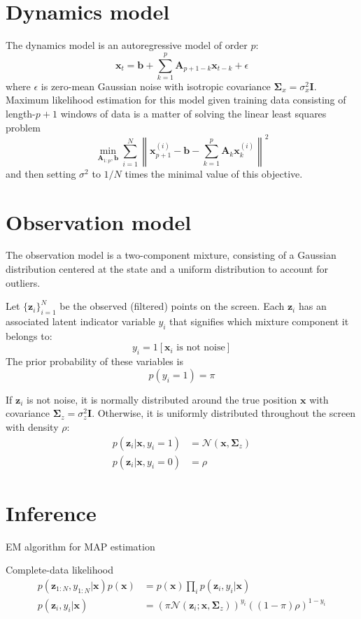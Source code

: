 \documentclass{article}
\newcommand{\bA}{\mathbf{A}}
\newcommand{\bI}{\mathbf{I}}
\newcommand{\bx}{\mathbf{x}}
\newcommand{\bz}{\mathbf{z}}
\newcommand{\bb}{\mathbf{b}}
\newcommand{\bSigma}{{\bm \Sigma}}
\newcommand{\cN}{\mathcal{N}}
\begin{document}
\section{Dynamics model}
The dynamics model is an autoregressive model of order $p$:
\[
\bx_t = \bb + \sum_{k=1}^p \bA_{p+1-k} \bx_{t-k} + \epsilon
\]
where $\epsilon$ is zero-mean Gaussian noise with isotropic covariance $\bSigma_x = \sigma_x^2\bI$.
Maximum likelihood estimation for this model given training data consisting of length-$p+1$ windows of data is a matter of solving the linear least squares problem
\[
\min_{\bA_{1:p}, \bb} \sum_{i=1}^N \left\| \bx_{p+1}^{(i)} - \bb - \sum_{k=1}^p\bA_k\bx_k^{(i)} \right\|^2
\]
and then setting $\sigma^2$ to $1/N$ times the minimal value of this objective.

\section{Observation model}
The observation model is a two-component mixture, consisting of a Gaussian distribution centered at the state and a uniform distribution to account for outliers.

Let $\{\bz_i\}_{i=1}^N$ be the observed (filtered) points on the screen. Each $\bz_i$ has an associated latent indicator variable $y_i$ that signifies which mixture component it belongs to:
\[
y_i = 1[\bx_i \mbox{ is not noise}]
\]
The prior probability of these variables is
\[
p(y_i = 1) = \pi
\]

If $\bz_i$ is not noise, it is normally distributed around the true position $\bx$ with covariance $\bSigma_z = \sigma_z^2\bI$. Otherwise, it is uniformly distributed throughout the screen with density $\rho$:
\begin{align*}
p(\bz_i | \bx, y_i=1) &= \cN(\bx, \bSigma_z) \\
p(\bz_i | \bx, y_i=0) &= \rho
\end{align*}

\section{Inference}

EM algorithm for MAP estimation

Complete-data likelihood
\begin{align*}
p(\bz_{1:N}, y_{1:N} | \bx)p(\bx) &= p(\bx) \prod_i p(\bz_i, y_i | \bx) \\
p(\bz_i, y_i | \bx) & = \left(\pi \cN(\bz_i; \bx, \bSigma_z)\right)^{y_i} \left( (1-\pi) \rho \right)^{1-y_i}
\end{align*}
\end{document}
